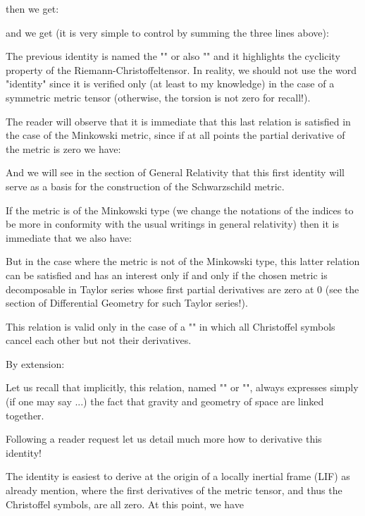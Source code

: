 	then we get:
	
	and we get (it is very simple to control by summing the three lines above):
	
	The previous identity is named the "\label{first bianchi identity}" or also "" and it highlights the cyclicity property of the  Riemann-Christoffeltensor. In reality, we should not use the word "identity" since it is verified only (at least to my knowledge) in the case of a symmetric metric tensor (otherwise, the torsion is not zero for recall!).

	The reader will observe that it is immediate that this last relation is satisfied in the case of the Minkowski metric, since if at all points the partial derivative of the metric is zero we have:
	
	And we will see in the section of General Relativity that this first identity will serve as a basis for the construction of the Schwarzschild metric.

	If the metric is of the Minkowski type (we change the notations of the indices to be more in conformity with the usual writings in general relativity) then it is immediate that we also have:
	
	But in the case where the metric is not of the Minkowski type, this latter relation can be satisfied and has an interest only if and only if the chosen metric is decomposable in Taylor series whose first partial derivatives are zero at $0$ (see the section of Differential Geometry for such Taylor series!).

	This relation is valid only in the case of a "" in which all Christoffel symbols cancel each other but not their derivatives.

	By extension:
	
	Let us recall that implicitly, this relation, named "\label{Bianchi second identity}" or "", always expresses simply (if one may say ...) the fact that gravity and geometry of space are linked together.

	Following a reader request let us detail much more how to derivative this identity!

	The identity is easiest to derive at the origin of a locally inertial frame (LIF) as already mention, where the first derivatives of the metric tensor, and thus the Christoffel symbols, are all zero. At this point, we have
	
